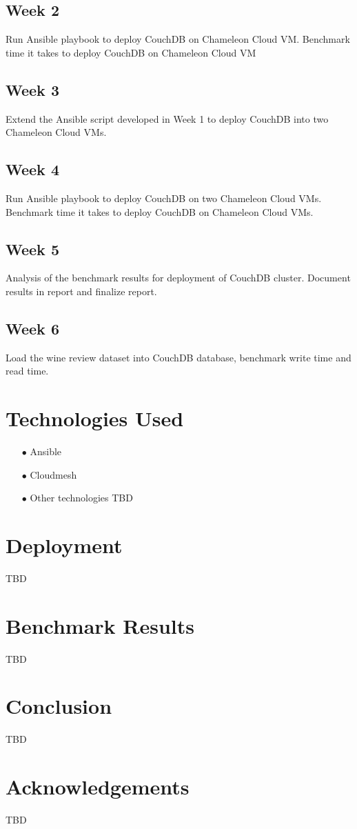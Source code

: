 \subsection{Week 2}

Run Ansible playbook to deploy CouchDB on Chameleon Cloud
VM. Benchmark time it takes to deploy CouchDB on Chameleon Cloud VM

\subsection{Week 3}

Extend the Ansible script developed in Week 1 to deploy CouchDB into
two Chameleon Cloud VMs.

\subsection{Week 4}

Run Ansible playbook to deploy CouchDB on two Chameleon Cloud
VMs. Benchmark time it takes to deploy CouchDB on Chameleon Cloud VMs.

\subsection{Week 5}

Analysis of the benchmark results for deployment of CouchDB
cluster. Document results in report and finalize report.

\subsection{Week 6}

Load the wine review dataset into CouchDB database, benchmark write time
and read time.

\section{Technologies Used}

\begin{itemize}
\item[$\bullet$] Ansible
\item[$\bullet$] Cloudmesh
\item[$\bullet$] Other technologies TBD
\end{itemize}

\section{Deployment}
TBD

\section{Benchmark Results}
TBD

\section{Conclusion}
TBD
\section*{Acknowledgements}

TBD


 






